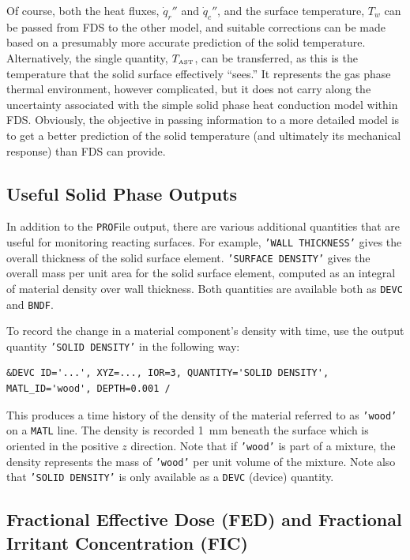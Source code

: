 \documentclass[11pt]{book}
\newcommand{\ct}{\tt\small}
\begin{document}
Of course, both the heat fluxes, $\dot{q}_r''$ and $\dot{q}_c''$, and
the surface temperature, $T_w$ can be passed from FDS to the other
model, and suitable corrections can be made based on a presumably more
accurate prediction of the solid temperature.  Alternatively, the
single quantity, $T_{\hbox{\tiny AST}}$, can be transferred, as this
is the temperature that the solid surface effectively ``sees.'' It
represents the gas phase thermal environment, however complicated, but
it does not carry along the uncertainty associated with the simple
solid phase heat conduction model within FDS. Obviously, the objective
in passing information to a more detailed model is to get a better
prediction of the solid temperature (and ultimately its mechanical
response) than FDS can provide.


\subsection{Useful Solid Phase Outputs}
\label{info:material_components}

In addition to the {\ct PROF}ile output, there are various additional quantities that are useful for monitoring reacting
surfaces. For example, {\ct 'WALL THICKNESS'} gives the overall thickness of the solid surface
element. {\ct 'SURFACE DENSITY'} gives the overall mass per unit area for the
solid surface element, computed as an integral of material density over wall
thickness. Both quantities are available both as {\ct DEVC} and {\ct BNDF}.

To record the change in a material
component's density with time, use the output quantity {\ct 'SOLID DENSITY'} in the following way:

\footnotesize
\begin{verbatim}
&DEVC ID='...', XYZ=..., IOR=3, QUANTITY='SOLID DENSITY', MATL_ID='wood', DEPTH=0.001 /
\end{verbatim} \normalsize

\noindent
This produces a time history of the density of the material referred to as {\ct 'wood'} on a {\ct MATL} line. The density
is recorded 1~mm beneath the surface which is oriented in the positive $z$ direction. Note that if {\ct 'wood'} is part of a mixture, the
density represents the mass of {\ct 'wood'} per unit volume of the mixture. Note also that {\ct 'SOLID DENSITY'} is only available as a
{\ct DEVC} (device) quantity.

\subsection{Fractional Effective Dose (FED) and Fractional Irritant Concentration (FIC)}
\label{info:FED}
\end{document}
